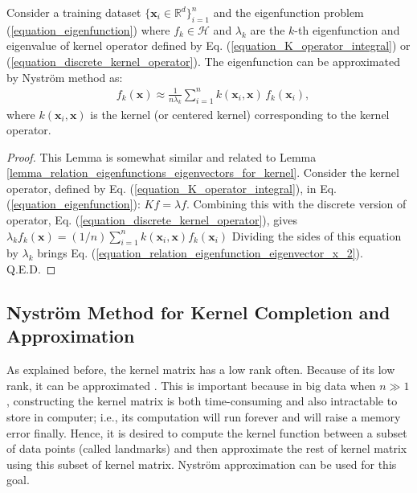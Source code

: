 \documentclass[lang=cn,10pt]{gorgeousnbook}
\numberwithin{equation}{section}%
\numberwithin{figure}{section}%
\begin{document}
\begin{lemma}\label{lemma_Nystrom_approx_eigenfunctions}
Consider a training dataset $\{\boldsymbol{x}_i \in \mathbb{R}^d\}_{i=1}^n$ and the eigenfunction problem (\ref{equation_eigenfunction}) where $f_k \in \mathcal{H}$ and $\lambda_k$ are the $k$-th eigenfunction and eigenvalue of kernel operator defined by Eq. (\ref{equation_K_operator_integral}) or (\ref{equation_discrete_kernel_operator}).
The eigenfunction can be approximated by Nystr{\"o}m method as:
\begin{align}
&f_k(\boldsymbol{x}) \approx \frac{1}{n \lambda_k} \sum_{i=1}^n k(\boldsymbol{x}_i, \boldsymbol{x})\, f_k(\boldsymbol{x}_i), \label{equation_relation_eigenfunction_eigenvector_x_2} 
\end{align}
where $k(\boldsymbol{x}_i, \boldsymbol{x})$ is the kernel (or centered kernel) corresponding to the kernel operator.  
\end{lemma}
\begin{proof}
This Lemma is somewhat similar and related to Lemma \ref{lemma_relation_eigenfunctions_eigenvectors_for_kernel}. 
Consider the kernel operator, defined by Eq. (\ref{equation_K_operator_integral}), in Eq. (\ref{equation_eigenfunction}): $K f = \lambda f$. Combining this with the discrete version of operator, Eq. (\ref{equation_discrete_kernel_operator}), gives $\lambda_k f_k(\boldsymbol{x}) = (1/n) \sum_{i=1}^n k(\boldsymbol{x}_i, \boldsymbol{x}) f_k(\boldsymbol{x}_i)$
Dividing the sides of this equation by $\lambda_k$ brings Eq. (\ref{equation_relation_eigenfunction_eigenvector_x_2}). Q.E.D.
\end{proof}


\subsection{Nystr{\"o}m Method for Kernel Completion and Approximation}\label{section_Nystrom_for_kernel}

As explained before, the kernel matrix has a low rank often. Because of its low rank, it can be approximated \cite{kishore2017literature}. This is important because in big data when $n \gg 1$, constructing the kernel matrix is both time-consuming and also intractable to store in computer; i.e., its computation will run forever and will raise a memory error finally. Hence, it is desired to compute the kernel function between a subset of data points (called landmarks) and then approximate the rest of kernel matrix using this subset of kernel matrix. Nystr{\"o}m approximation can be used for this goal. 
\end{document}
